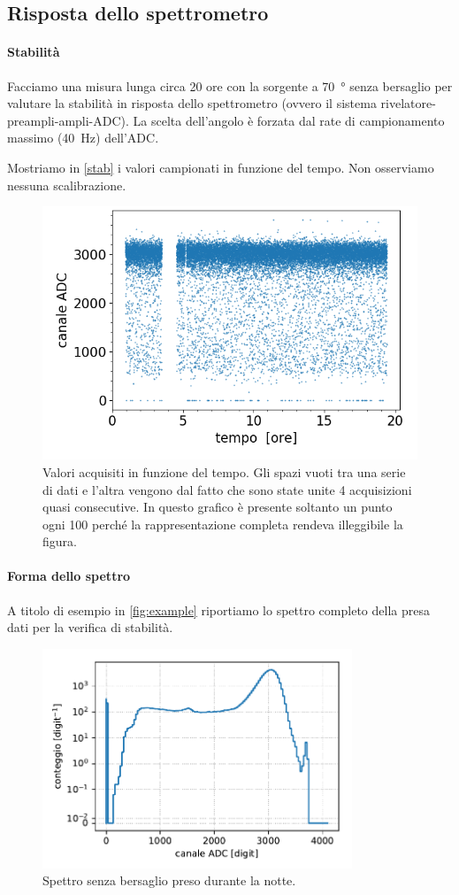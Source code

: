 \subsection{Risposta dello spettrometro}

\paragraph{Stabilità} Facciamo una misura lunga circa 20 ore con la sorgente a \SI{70}{\degree} senza bersaglio per valutare la stabilità in risposta dello spettrometro (ovvero il sistema rivelatore-preampli-ampli-ADC).
La scelta dell'angolo è forzata dal rate di campionamento massimo (\SI{40}{Hz}) dell'ADC.

Mostriamo in \autoref{stab} i valori campionati in funzione del tempo.
Non osserviamo nessuna scalibrazione.

\begin{figure}[h]
\centering
\includegraphics[width=23 em]{immagini/stab.png}
\caption{Valori acquisiti in funzione del tempo. Gli spazi vuoti tra una serie di dati e l'altra vengono dal fatto che sono state unite 4 acquisizioni quasi consecutive.
In questo grafico è presente soltanto un punto ogni 100 perché la rappresentazione completa rendeva illeggibile la figura.}
\label{stab}
\end{figure}

\paragraph{Forma dello spettro}

A titolo di esempio in \autoref{fig:example}
riportiamo lo spettro completo della presa dati per la verifica di stabilità.

\begin{figure}
	\centering
	\includegraphics[width=25em]{immagini/example}
	\caption{\label{fig:example}
	Spettro senza bersaglio preso durante la notte.}
\end{figure}

